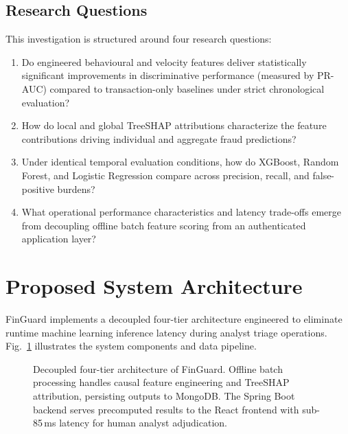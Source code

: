 \documentclass[conference]{IEEEtran}
\begin{document}
\subsection{Research Questions}
This investigation is structured around four research questions:
\begin{enumerate}
    \item[\textbf{RQ1}:] Do engineered behavioural and velocity features deliver statistically significant improvements in discriminative performance (measured by PR-AUC) compared to transaction-only baselines under strict chronological evaluation?
    \item[\textbf{RQ2}:] How do local and global TreeSHAP attributions characterize the feature contributions driving individual and aggregate fraud predictions?
    \item[\textbf{RQ3}:] Under identical temporal evaluation conditions, how do XGBoost, Random Forest, and Logistic Regression compare across precision, recall, and false-positive burdens?
    \item[\textbf{RQ4}:] What operational performance characteristics and latency trade-offs emerge from decoupling offline batch feature scoring from an authenticated application layer?
\end{enumerate}

\section{Proposed System Architecture}

FinGuard implements a decoupled four-tier architecture engineered to eliminate runtime machine learning inference latency during analyst triage operations. Fig.~\ref{fig:architecture} illustrates the system components and data pipeline.

\begin{figure}[t]
\centering

\caption{Decoupled four-tier architecture of FinGuard. Offline batch processing handles causal feature engineering and TreeSHAP attribution, persisting outputs to MongoDB. The Spring Boot backend serves precomputed results to the React frontend with sub-85\,ms latency for human analyst adjudication.}
\label{fig:architecture}
\end{figure}
\end{document}

